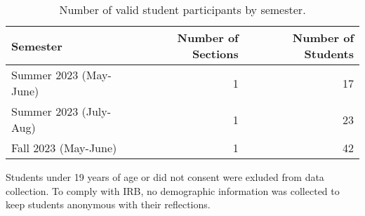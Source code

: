 \documentclass[
  12pt,
]{article}
\begin{document}
\newpage

\begin{table}[H]

\begin{threeparttable}
\caption{\label{tab:unnamed-chunk-5}Number of valid student participants by semester.}
\centering
\begin{tabular}[t]{lrr}
\toprule
Semester & Number of Sections & Number of Students\\
\midrule
Summer 2023 (May-June) & 1 & 17\\
Summer 2023 (July-Aug) & 1 & 23\\
Fall 2023 (May-June) & 1 & 42\\
\bottomrule
\end{tabular}
\begin{tablenotes}
\small
\item [] Students under 19 years of age or did not consent were exluded from data collection. To comply with IRB, no demographic information was collected to keep students anonymous with their reflections.
\end{tablenotes}
\end{threeparttable}
\end{table}
\end{document}
